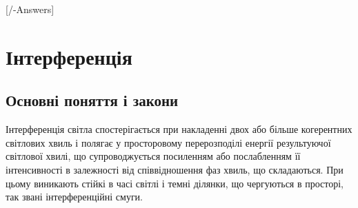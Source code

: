 
[\currfilebase/\currfilebase-Answers]
\chapter{Інтерференція}\label{\currfilebase}
\makeatletter
{}
\makeatother


\section{Основні поняття і закони}


Інтерференція світла спостерігається при накладенні двох або більше когерентних світлових хвиль і полягає у просторовому перерозподілі енергії результуючої світлової хвилі, що супроводжується посиленням або послабленням її інтенсивності в залежності від співвідношення фаз хвиль, що складаються. При цьому виникають стійкі в часі світлі і темні ділянки, що чергуються в просторі, так звані інтерференційні смуги.%


